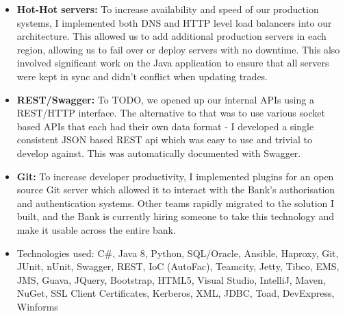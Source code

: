 \documentclass[11pt,a4paper, roman]{moderncv} %
\begin{document}
{\begin{itemize}
\item \textbf{Hot-Hot servers:} To increase availability and speed of our production systems, I implemented both DNS and HTTP level load balancers into our architecture. This allowed us to add additional production servers in each region, allowing us to fail over or deploy servers with no downtime. This also involved significant work on the Java application to ensure that all servers were kept in sync and didn't conflict when updating trades.
\item \textbf{REST/Swagger:} To TODO, we opened up our internal APIs using a REST/HTTP interface. The alternative to that was to use various socket based APIs that each had their own data format - I developed a single consistent JSON based REST api which was easy to use and trivial to develop against. This was automatically documented with Swagger.
\item \textbf{Git:} To increase developer productivity, I implemented plugins for an open source Git server which allowed it to interact with the Bank's authorisation and authentication systems. Other teams rapidly migrated to the solution I built, and the Bank is currently hiring someone to take this technology and make it usable across the entire bank.
\item {Technologies used:} C\#, Java 8, Python, SQL/Oracle, Ansible, Haproxy, Git, JUnit, nUnit, Swagger, REST, IoC (AutoFac), Teamcity, Jetty, Tibco, EMS, JMS, Guava, JQuery, Bootstrap, HTML5, Visual Studio, IntelliJ, Maven, NuGet, SSL Client Certificates, Kerberos, XML, JDBC, Toad, DevExpress, Winforms
\end{itemize}
}

\end{document}
